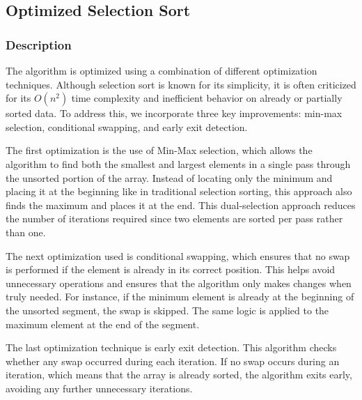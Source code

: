 \subsection{Optimized Selection Sort}

\subsubsection{Description}

The algorithm is optimized using a combination of different optimization techniques. Although selection sort is known for its simplicity, it is often criticized for its $O(n^2)$ time complexity and inefficient behavior on already or partially sorted data. To address this, we incorporate three key improvements: min-max selection, conditional swapping, and early exit detection.


The first optimization is the use of Min-Max selection, which allows the algorithm to find both the smallest and largest elements in a single pass through the unsorted portion of the array. Instead of locating only the minimum and placing it at the beginning like in traditional selection sorting, this approach also finds the maximum and places it at the end. This dual-selection approach reduces the number of iterations required since two elements are sorted per pass rather than one. 

The next optimization used is conditional swapping, which ensures that no swap is performed if the element is already in its correct position. This helps avoid unnecessary operations and ensures that the algorithm only makes changes when truly needed. For instance, if the minimum element is already at the beginning of the unsorted segment, the swap is skipped. The same logic is applied to the maximum element at the end of the segment. 

The last optimization technique is early exit detection. This algorithm checks whether any swap occurred during each iteration. If no swap occurs during an iteration, which means that the array is already sorted, the algorithm exits early, avoiding any further unnecessary iterations. 



